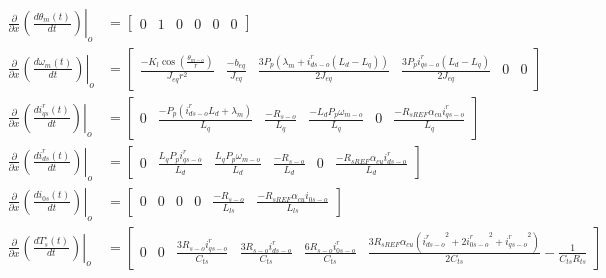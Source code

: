 \documentclass[a4paper, 10pt, onecolumn,journal]{ieeeconf}
\begin{document}
\begin{equation}
    \begin{aligned}
        \left.\frac{\partial}{\partial x}\left( \frac{d \theta_m(t)}{dt}\right) \right|_{o} &= \begin{bmatrix} 0 & 1 & 0 & 0 & 0 & 0 \end{bmatrix}\\
        \left.\frac{\partial}{\partial x}\left( \frac{d \omega_m(t)}{dt}\right) \right|_{o}&= \begin{bmatrix}
        \frac{-K_{l} \cos\left(\frac{\theta_{m-o}}{r}\right)}{J_{eq} r^2}& \frac{-b_{eq}}{J_{eq}} & \frac{3 P_p \left(\lambda_m+i^r_{ds-o} \left(L_d-L_q\right)\right)}{2 J_{eq}} & \frac{3 P_p i^r_{qs-o} \left(L_d-L_q\right)}{2 J_{eq}} & 0 & 0 
        \end{bmatrix}\\
        \left.\frac{\partial}{\partial x}\left( \frac{d i^r_{qs}(t)}{dt}\right) \right|_{o}&= \begin{bmatrix} 
        0 & \frac{-P_p \left(i^r_{ds-o} L_d+\lambda_m\right)}{L_q} & \frac{-R_{s-o}}{L_q} & \frac{-L_d P_p \omega_{m-o}}{L_q} & 0 & \frac{-R_{sREF} \alpha_{cu} i^r_{qs-o}}{L_q} 
        \end{bmatrix}\\
        \left.\frac{\partial}{\partial x}\left( \frac{d i^r_{ds}(t)}{dt}\right) \right|_{o}&= \begin{bmatrix} 
        0 & \frac{L_q P_p i^r_{qs-o}}{L_d} & \frac{L_q P_p \omega_{m-o}}{L_d} & \frac{-R_{s-o}}{L_d} & 0 & \frac{-R_{sREF} \alpha_{cu} i^r_{ds-o}}{L_d} 
        \end{bmatrix}\\
        \left.\frac{\partial}{\partial x}\left( \frac{d i_{0s}(t)}{dt}\right) \right|_{o}&= \begin{bmatrix} 
        0 & 0 & 0 & 0 & \frac{-R_{s-o}}{L_{ls}} & \frac{-R_{sREF} \alpha_{cu} i_{0s-o}}{L_{ls}} 
        \end{bmatrix}\\
        \left.\frac{\partial}{\partial x}\left( \frac{d T^\circ_{s}(t)}{dt}\right)\right|_{o} &= \begin{bmatrix} 
        0 & 0 & \frac{3 R_{s-o} i^r_{qs-o}}{C_{ts}} & \frac{3 R_{s-o} i^r_{ds-o}}{C_{ts}} & \frac{6 R_{s-o} i^r_{0s-o}}{C_{ts}} & \frac{3 R_{sREF} \alpha_{cu} \left({i^r_{ds-o}}^2+2 {i^r_{0s-o}}^2+{i^r_{qs-o}}^2\right)}{2 C_{ts}} - \frac{1}{C_{ts} R_{ts}} 
        \end{bmatrix}\\
    \end{aligned}
    \label{gradientesA}
\end{equation}
\end{document}
